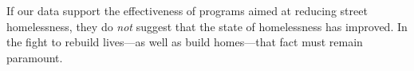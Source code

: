 \documentclass[11pt]{article}
\begin{document}
If our data support the effectiveness of programs aimed at reducing street homelessness, 
they do {\it not} suggest that the state of homelessness has improved. In the fight to rebuild lives---as well 
as build homes---that fact must remain paramount.


%


%
%
%


\end{document}
